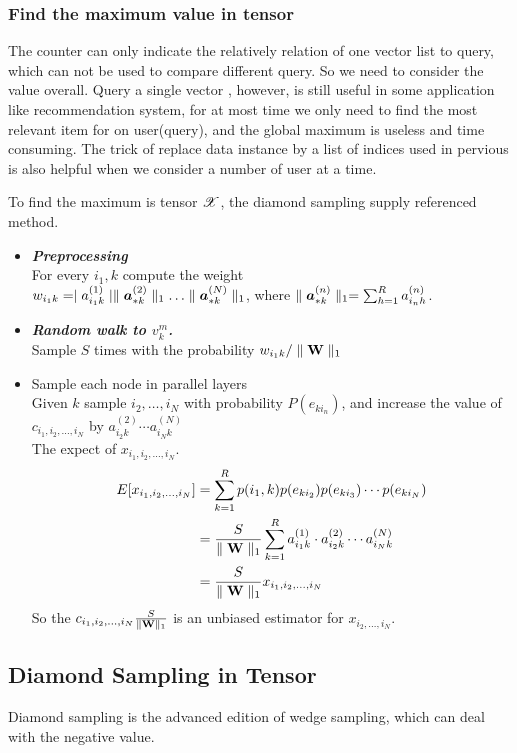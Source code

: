 \documentclass{article}
\newcommand{\Sca}[3]{{#1}^{(#2)}_{i_#2#3}}%
\newcommand{\T}[1]{\boldsymbol{\mathscr{\MakeUppercase{#1}}}}%
\newcommand{\V}[1]{{\bm{{\MakeLowercase{#1}}}}}%
\newcommand{\Vacol}[1]{\V{a}^{(#1)}_{*k}}
\newcommand{\M}[1]{{\bm{\mathbf{\MakeUppercase{#1}}}}}%
\newcommand{\norm}[2]{\parallel#1\parallel_{#2}}
\begin{document}
\subsubsection{Find the maximum value in tensor }
The counter can only indicate the relatively relation of one vector list to query, which can not be used to compare different query. So we need to consider the value overall. Query a single vector , however, is still useful in some application like recommendation system, for at most time we only need to find the most relevant item for on user(query), and the global maximum is useless and time consuming. The trick of replace data instance by a list of indices used in pervious is also helpful when we consider a number of user at a time.

To find the maximum is tensor $\T{X}$, the diamond sampling supply referenced method.
\begin{itemize}
  \item \emph{\textbf{Preprocessing}}\\
    For every $i_1,k$ compute the weight\\
   $w_{i_1k} = \mid \Sca{a}{1}{k}\mid  \norm{\Vacol{2}}{1}\ldots\norm{\Vacol{N}}{1}$, where $\norm{\Vacol{n}}{1} = \sum_{h=1}^{R}\Sca{a}{n}{h}$.
  \item \emph{\textbf{Random walk to $v_k^m$.}}\\
    Sample $S$ times  with the probability $w_{i_1k}/\norm{\M{W}}{1}$

  \item Sample each node in parallel layers \\
    Given $k$ sample ${i_2,\ldots,i_N}$ with probability $P(e_{ki_n})$, and increase the value of $c_{i_1,i_2,\ldots,i_N}$ by $\Sca{a}{2}{k}\cdots\Sca{a}{N}{k} $ \\
  The expect of $x_{i_1,i_2,\ldots,i_N}$.
        \begin{align*}
        E[x_{i_1,i_2,\ldots,i_N}] &= \sum_{k=1}^{R} p(i_1,k) p(e_{ki_2}) p(e_{ki_3}) \cdots p(e_{ki_N})\\
               &= \frac{S}{\norm{\M{W}}{1}}\sum_{k=1}^{R}\Sca{a}{1}{k}\cdot\Sca{a}{2}{k}\cdots\Sca{a}{N}{k}\\
               &= \frac{S}{\norm{\M{W}}{1}}x_{i_1,i_2,\ldots,i_N}
        \end{align*}
    So the  $c_{i_1,i_2,\ldots,i_N}\frac{S}{\norm{\M{W}}{1}}$ is an unbiased estimator for $x_{i_2,\ldots,i_N}$.
\end{itemize}


\subsection{Diamond Sampling in Tensor}
Diamond sampling is the advanced edition of wedge sampling, which can deal with the negative value.
\end{document}
